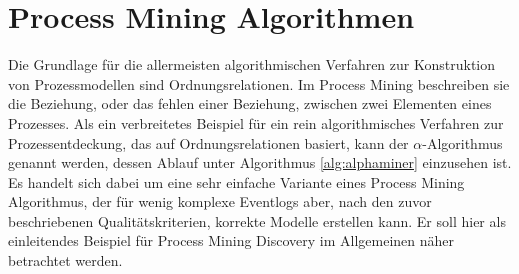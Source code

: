 

\section{Process Mining Algorithmen}
Die Grundlage für die allermeisten algorithmischen Verfahren zur Konstruktion von Prozessmodellen sind Ordnungsrelationen. Im Process Mining beschreiben sie die Beziehung, oder das fehlen einer Beziehung, zwischen zwei Elementen eines Prozesses. 
Als ein verbreitetes  Beispiel für ein rein algorithmisches Verfahren zur Prozessentdeckung, das auf Ordnungsrelationen basiert, kann der $\alpha$-Algorithmus genannt werden, dessen Ablauf unter Algorithmus \ref{alg:alphaminer} einzusehen ist.
Es handelt sich dabei um eine sehr einfache Variante eines Process Mining Algorithmus, der für wenig komplexe Eventlogs aber, nach den zuvor beschriebenen Qualitätskriterien, korrekte Modelle erstellen kann. Er soll hier als einleitendes Beispiel für Process Mining Discovery im Allgemeinen näher betrachtet werden. \newline

